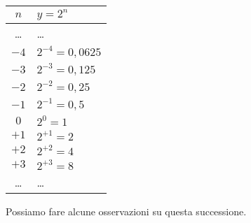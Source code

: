  \begin{minipage}[]{.48\textwidth}
  \begin{center}
   \begin{tabular}{c|l}
    \(n\)   & \(y=2^n\) \\
    \hline
    \dots & \dots \\
    \(-4\) & \(2^{-4} = 0,0625\) \\
    \(-3\) & \(2^{-3} = 0,125\) \\
    \(-2\) & \(2^{-2} = 0,25\) \\
    \(-1\) & \(2^{-1} = 0,5\) \\
    \(0\) & \(2^{0} = 1\) \\
    \(+1\) & \(2^{+1} = 2\) \\
    \(+2\) & \(2^{+2} = 4\) \\
    \(+3\) & \(2^{+3} = 8\) \\
    \dots & \dots \\
   \end{tabular}
  \end{center}
 \end{minipage}
\begin{minipage}[]{.48\textwidth}
\begin{center}
\begin{inaccessibleblock}
  \puntia
\end{inaccessibleblock}
\end{center}
\end{minipage}

Possiamo fare alcune osservazioni su questa successione.


